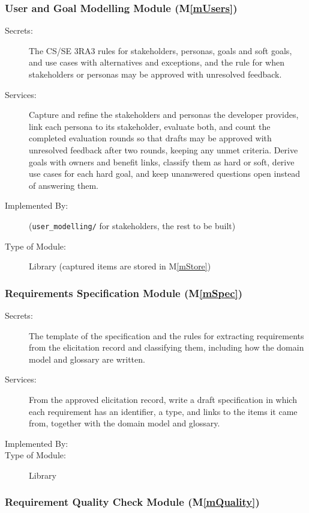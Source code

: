 \documentclass[12pt, titlepage]{article}
\newcommand{\mref}[1]{M\ref{#1}}
\begin{document}
\subsubsection{User and Goal Modelling Module (\mref{mUsers})}

\begin{description}
\item[Secrets:]The CS/SE 3RA3 rules for stakeholders, personas, goals and soft goals, and use cases with
  alternatives and exceptions, and the rule for when stakeholders or personas
  may be approved with unresolved feedback.
\item[Services:]Capture and refine the stakeholders and personas the developer
  provides, link each persona to its stakeholder, evaluate both, and count the
  completed evaluation rounds so that drafts may be approved with unresolved
  feedback after two rounds, keeping any unmet criteria. Derive goals with
  owners and benefit links, classify them as hard or soft, derive use cases
  for each hard goal, and keep unanswered questions open instead of answering
  them.
\item[Implemented By:] \progname{} (\texttt{user\_modelling/} for
  stakeholders, the rest to be built)
\item[Type of Module:] Library (captured items are stored in \mref{mStore})
\end{description}

\subsubsection{Requirements Specification Module (\mref{mSpec})}

\begin{description}
\item[Secrets:]The template of the specification and the rules for extracting
  requirements from the elicitation record and classifying them, including how
  the domain model and glossary are written.
\item[Services:]From the approved elicitation record, write a draft
  specification in which each requirement has an identifier, a type, and links
  to the items it came from, together with the domain model and glossary.
\item[Implemented By:] \progname{}
\item[Type of Module:] Library
\end{description}

\subsubsection{Requirement Quality Check Module (\mref{mQuality})}
\end{document}
